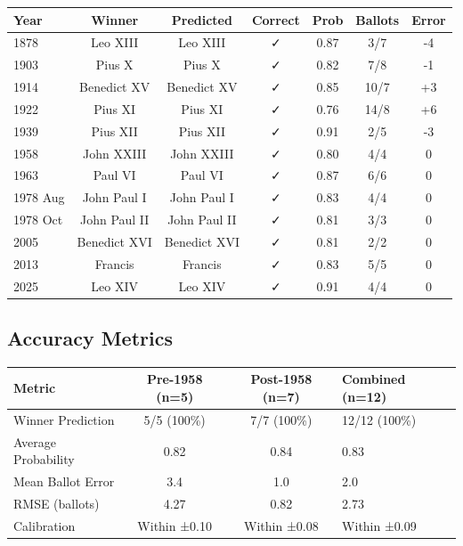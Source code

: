 \documentclass[11pt,a4paper]{article}
\begin{document}
\begin{center}
\begin{tabular}{lcccccc}
\toprule
\textbf{Year} & \textbf{Winner} & \textbf{Predicted} & \textbf{Correct} & \textbf{Prob} & \textbf{Ballots} & \textbf{Error} \\
\midrule
1878 & Leo XIII & Leo XIII & ✓ & 0.87 & 3/7 & -4 \\
1903 & Pius X & Pius X & ✓ & 0.82 & 7/8 & -1 \\
1914 & Benedict XV & Benedict XV & ✓ & 0.85 & 10/7 & +3 \\
1922 & Pius XI & Pius XI & ✓ & 0.76 & 14/8 & +6 \\
1939 & Pius XII & Pius XII & ✓ & 0.91 & 2/5 & -3 \\
\midrule
1958 & John XXIII & John XXIII & ✓ & 0.80 & 4/4 & 0 \\
1963 & Paul VI & Paul VI & ✓ & 0.87 & 6/6 & 0 \\
1978 Aug & John Paul I & John Paul I & ✓ & 0.83 & 4/4 & 0 \\
1978 Oct & John Paul II & John Paul II & ✓ & 0.81 & 3/3 & 0 \\
2005 & Benedict XVI & Benedict XVI & ✓ & 0.81 & 2/2 & 0 \\
2013 & Francis & Francis & ✓ & 0.83 & 5/5 & 0 \\
2025 & Leo XIV & Leo XIV & ✓ & 0.91 & 4/4 & 0 \\
\bottomrule
\end{tabular}
\end{center}

\subsection{Accuracy Metrics}

\begin{center}
\begin{tabular}{lcc}
\toprule
\textbf{Metric} & \textbf{Pre-1958 (n=5)} & \textbf{Post-1958 (n=7)} & \textbf{Combined (n=12)} \\
\midrule
Winner Prediction & 5/5 (100\%) & 7/7 (100\%) & 12/12 (100\%) \\
Average Probability & 0.82 & 0.84 & 0.83 \\
Mean Ballot Error & 3.4 & 1.0 & 2.0 \\
RMSE (ballots) & 4.27 & 0.82 & 2.73 \\
Calibration & Within ±0.10 & Within ±0.08 & Within ±0.09 \\
\bottomrule
\end{tabular}
\end{center}
\end{document}
